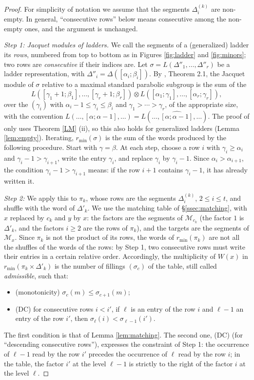 \documentclass[a4paper,12pt,leqno]{amsart}
\newcommand{\caM}{\mathcal{M}}
\theoremstyle{plain}
\theoremstyle{definition}
\theoremstyle{definition}
\begin{document}
\begin{proof}
For simplicity of notation we assume that the segments $\Delta^{(k)}_i$ are non-empty. In general,
``consecutive rows'' below means consecutive among the non-empty ones, and the argument is unchanged.

\emph{Step 1: Jacquet modules of ladders.} We call the segments of a (generalized) ladder its
\emph{rows}, numbered from top to bottom as in Figures \ref{fig:ladder} and \ref{fig:minors}; two rows
are \emph{consecutive} if their indices are. Let $\sigma=L(\Delta''_1,\ldots,\Delta''_r)$ be a ladder
representation, with $\Delta''_i=\Delta([\alpha_i;\beta_i])$. By \cite{KL12}, Theorem 2.1, the
Jacquet module of $\sigma$ relative to a maximal standard parabolic subgroup is the sum of the
\[L([\gamma_1+1;\beta_1],\ldots,[\gamma_r+1;\beta_r])\otimes
L([\alpha_1;\gamma_1],\ldots,[\alpha_r;\gamma_r]),\]
over the $(\gamma_i)$ with $\alpha_i-1\leq\gamma_i\leq\beta_i$ and $\gamma_1>\cdots>\gamma_r$, of
the appropriate size, with the convention
$L(\ldots,[\alpha;\alpha-1],\ldots)=L(\ldots,\widehat{[\alpha;\alpha-1]},\ldots)$. The proof of
\cite{KL12} only uses Theorem \ref{LM} (ii), so this also holds for generalized ladders (Lemma
\ref{lem:empty}). Iterating, $r_{\min}(\sigma)$ is the sum of the words produced by the following
procedure. Start with $\gamma=\beta$. At each step, choose a row $i$ with $\gamma_i\geq\alpha_i$
and $\gamma_i-1>\gamma_{i+1}$, write the entry $\gamma_i$, and replace $\gamma_i$ by $\gamma_i-1$.
Since $\alpha_i>\alpha_{i+1}$, the condition $\gamma_i-1>\gamma_{i+1}$ means: if the row $i+1$
contains $\gamma_i-1$, it has already written it.

\emph{Step 2:} We apply this to $\pi_k$, whose rows are the segments $\Delta^{(k)}_i$,
$2\leq i\leq t$, and shuffle with the word of $\Delta'_k$. We use the matching table of
\S\ref{ssec:matching}, with $x$ replaced by $c_k$ and $y$ by $x$: the factors are the segments of
$\caM_{c_k}$ (the factor $1$ is $\Delta'_k$, and the factors $i\geq2$ are the rows of $\pi_k$), and the
targets are the segments of $\caM_x$. Since $\pi_k$ is not the product of its rows, the words of
$r_{\min}(\pi_k)$ are not all the shuffles of the words of the rows: by Step 1, two consecutive rows
must write their entries in a certain relative order. Accordingly, the multiplicity of $W(x)$ in
$r_{\min}(\pi_k\times\Delta'_k)$ is the number of fillings $(\sigma_c)$ of the table, still called
\emph{admissible}, such that:
\begin{itemize}
\item (monotonicity) $\sigma_c(m)\leq\sigma_{c+1}(m)$;
\item (DC) for consecutive rows $i<i'$, if $\ell$ is an entry of the row $i$ and $\ell-1$ an entry
of the row $i'$, then $\sigma_\ell(i)<\sigma_{\ell-1}(i')$.
\end{itemize}
The first condition is that of Lemma \ref{lem:matching}. The second one, (DC) (for ``descending
consecutive rows''), expresses the constraint of Step 1: the occurrence of $\ell-1$ read by the row
$i'$ precedes the occurrence of $\ell$ read by the row $i$; in the table, the factor $i'$ at the level
$\ell-1$ is strictly to the right of the factor $i$ at the level $\ell$.


\end{proof}
\end{document}
